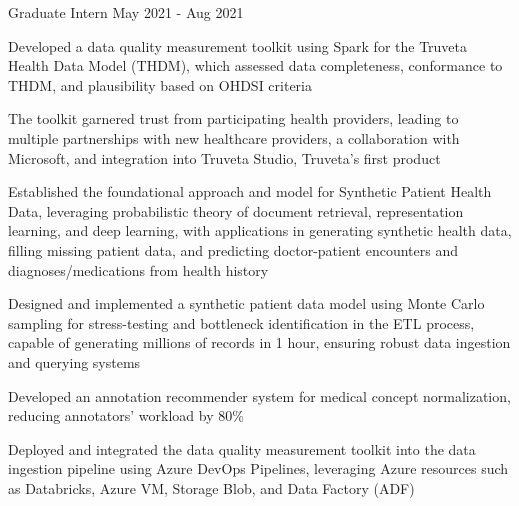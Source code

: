 \begin{cventries}
	\cventry
	{Graduate Intern}
	{}
	{}
	{May 2021 - Aug 2021}
	{\begin{cvitems}
			\item {Developed a data quality measurement toolkit using Spark for the Truveta Health Data Model (THDM), which assessed data completeness, conformance to THDM, and plausibility based on OHDSI criteria}
			\item {The toolkit garnered trust from participating health providers, leading to multiple partnerships with new healthcare providers, a collaboration with Microsoft, and integration into Truveta Studio, Truveta's first product}
			\item {Established the foundational approach and model for Synthetic Patient Health Data, leveraging probabilistic theory of document retrieval, representation learning, and deep learning, with applications in generating synthetic health data, filling missing patient data, and predicting doctor-patient encounters and diagnoses/medications from health history}
			\item {Designed and implemented a synthetic patient data model using Monte Carlo sampling for stress-testing and bottleneck identification in the ETL process, capable of generating millions of records in 1 hour, ensuring robust data ingestion and querying systems}
			\item {Developed an annotation recommender system for medical concept normalization, reducing annotators' workload by 80\%}
			\item {Deployed and integrated the data quality measurement toolkit into the data ingestion pipeline using Azure DevOps Pipelines, leveraging Azure resources such as Databricks, Azure VM, Storage Blob, and Data Factory (ADF)}
		\end{cvitems}}


\end{cventries}